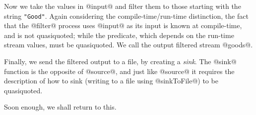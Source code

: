 Now we take the values in @input@ and filter them to those starting with the string \lstinline/"Good"/.
Again considering the compile-time/run-time distinction, the fact that the @filter@ process uses @input@ as its input is known at compile-time, and is not quasiquoted; while the predicate, which depends on the run-time stream values, must be quasiquoted.
We call the output filtered stream @goods@.

Finally, we send the filtered output to a file, by creating a \emph{sink}.
The @sink@ function is the opposite of @source@, and just like @source@ it requires the description of how to sink (writing to a file using @sinkToFile@) to be quasiquoted.

Soon enough, we shall return to this.


% 
% 

% 
% 
% 



